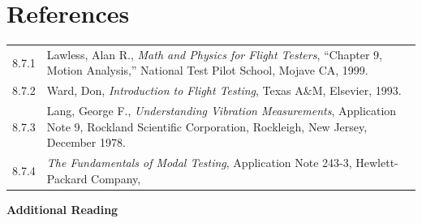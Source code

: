 \documentclass[
]{book}
\begin{document}
\hypertarget{references-6}{%
\section{References}\label{references-6}}

\begin{longtable}[]{@{}ll@{}}
\toprule
\endhead
\begin{minipage}[t]{0.06\columnwidth}\raggedright
8.7.1\strut
\end{minipage} & \begin{minipage}[t]{0.88\columnwidth}\raggedright
Lawless, Alan R., \emph{Math and Physics for Flight Testers}, ``Chapter 9, Motion Analysis,'' National Test Pilot School, Mojave CA, 1999.\strut
\end{minipage}\tabularnewline
\begin{minipage}[t]{0.06\columnwidth}\raggedright
8.7.2\strut
\end{minipage} & \begin{minipage}[t]{0.88\columnwidth}\raggedright
Ward, Don, \emph{Introduction to Flight Testing}, Texas A\&M, Elsevier, 1993.\strut
\end{minipage}\tabularnewline
\begin{minipage}[t]{0.06\columnwidth}\raggedright
8.7.3\strut
\end{minipage} & \begin{minipage}[t]{0.88\columnwidth}\raggedright
Lang, George F., \emph{Understanding Vibration Measurements}, Application Note 9, Rockland Scientific Corporation, Rockleigh, New Jersey, December 1978.\strut
\end{minipage}\tabularnewline
\begin{minipage}[t]{0.06\columnwidth}\raggedright
8.7.4\strut
\end{minipage} & \begin{minipage}[t]{0.88\columnwidth}\raggedright
\emph{The Fundamentals of Modal Testing}, Application Note 243-3, Hewlett-Packard Company,\strut
\end{minipage}\tabularnewline
\bottomrule
\end{longtable}

\textbf{Additional Reading}
\end{document}
